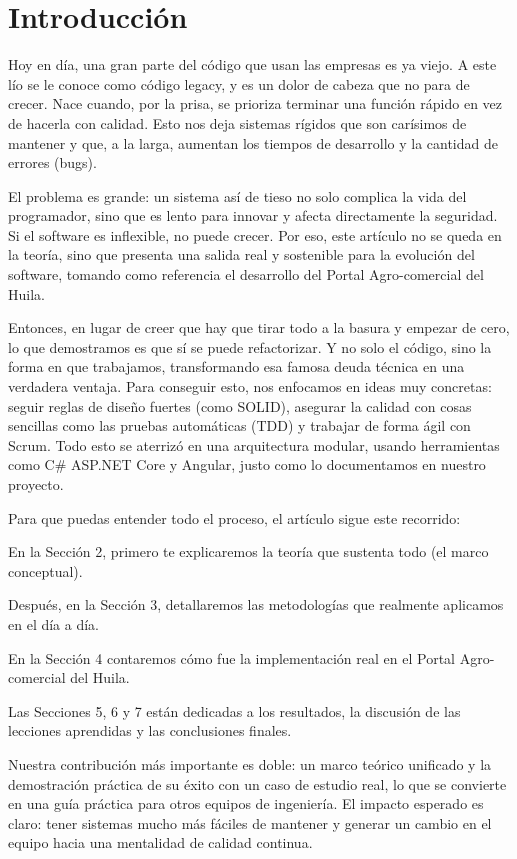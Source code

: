 \section{Introducción}
Hoy en día, una gran parte del código que usan las empresas es ya viejo. A este lío se le conoce como código legacy, y es un dolor de cabeza que no para de crecer. Nace cuando, por la prisa, se prioriza terminar una función rápido en vez de hacerla con calidad. Esto nos deja sistemas rígidos que son carísimos de mantener y que, a la larga, aumentan los tiempos de desarrollo y la cantidad de errores (bugs).

El problema es grande: un sistema así de tieso no solo complica la vida del programador, sino que es lento para innovar y afecta directamente la seguridad. Si el software es inflexible, no puede crecer. Por eso, este artículo no se queda en la teoría, sino que presenta una salida real y sostenible para la evolución del software, tomando como referencia el desarrollo del Portal Agro-comercial del Huila.

Entonces, en lugar de creer que hay que tirar todo a la basura y empezar de cero, lo que demostramos es que sí se puede refactorizar. Y no solo el código, sino la forma en que trabajamos, transformando esa famosa deuda técnica en una verdadera ventaja. Para conseguir esto, nos enfocamos en ideas muy concretas: seguir reglas de diseño fuertes (como SOLID), asegurar la calidad con cosas sencillas como las pruebas automáticas (TDD) y trabajar de forma ágil con Scrum. Todo esto se aterrizó en una arquitectura modular, usando herramientas como C\# ASP.NET Core y Angular, justo como lo documentamos en nuestro proyecto.

Para que puedas entender todo el proceso, el artículo sigue este recorrido:

En la Sección 2, primero te explicaremos la teoría que sustenta todo (el marco conceptual).

Después, en la Sección 3, detallaremos las metodologías que realmente aplicamos en el día a día.

En la Sección 4 contaremos cómo fue la implementación real en el Portal Agro-comercial del Huila.

Las Secciones 5, 6 y 7 están dedicadas a los resultados, la discusión de las lecciones aprendidas y las conclusiones finales.

Nuestra contribución más importante es doble: un marco teórico unificado y la demostración práctica de su éxito con un caso de estudio real, lo que se convierte en una guía práctica para otros equipos de ingeniería. El impacto esperado es claro: tener sistemas mucho más fáciles de mantener y generar un cambio en el equipo hacia una mentalidad de calidad continua.